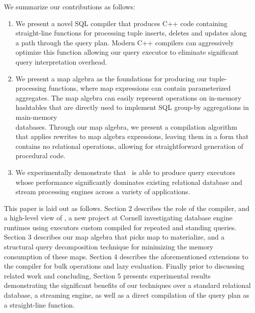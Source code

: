 We summarize our contributions as follows:

\begin{enumerate}
  \item We present a novel SQL compiler that produces C++ code containing
  straight-line functions for processing tuple inserts, deletes and updates
  along a path through the query plan. Modern C++ compilers can aggressively
  optimize this function allowing our query executor to eliminate significant
  query interpretation overhead.
  \item We present a map algebra as the foundations for producing our
  tuple-processing functions, where map expressions can contain parameterized
  aggregates. The map algebra can easily represent operations on in-memory
  hashtables that are directly used to implement SQL group-by aggregations in
  main-memory\\databases. Through our map algebra, we present a compilation
  algorithm that applies rewrites to map algebra expressions, leaving them in a
  form that contains no relational operations, allowing for straightforward
  generation of procedural code.
  \item We experimentally demonstrate that \compiler\ is able to produce
  query executors whose performance significantly dominates existing relational
  database and stream processing engines across a variety of applications. 
\end{enumerate}


This paper is laid out as follows. Section 2 describes the role of the compiler,
and a high-level view of \compiler, a new project at Cornell investigating
database engine runtimes using executors custom compiled for repeated and
standing queries.
Section 3 describes our map algebra that picks map to materialize, and a
structural query decomposition technique for minimizing the memory consumption of
these maps. Section 4 describes the aforementioned extensions to the compiler
for bulk operations and lazy evaluation. Finally prior to discussing
related work and concluding, Section 5 presents experimental results
demonstrating the significant benefits of our techniques over a standard
relational database, a streaming engine, as well as a direct compilation of the
query plan as a straight-line function.






